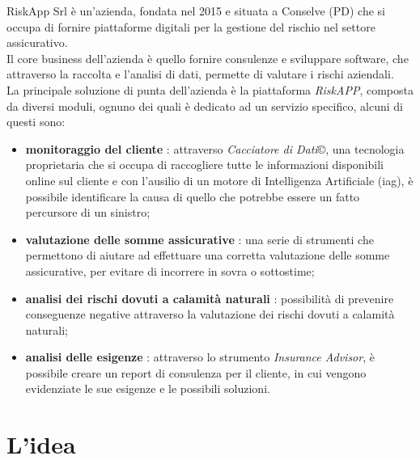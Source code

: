 RiskApp Srl è un'azienda, fondata nel 2015 e situata a Conselve (PD) che si occupa di fornire piattaforme digitali per la gestione del rischio nel settore assicurativo.\\
\indent Il core business dell'azienda è quello fornire consulenze e sviluppare software, che attraverso la raccolta e l'analisi di dati, permette di valutare i rischi aziendali. \\
\indent La principale soluzione di punta dell'azienda è la piattaforma \emph{RiskAPP}, composta da diversi moduli, ognuno dei quali è dedicato ad un servizio specifico, alcuni di questi sono:
\begin{itemize}
    \item \textbf{monitoraggio del cliente} \cite{site:riskapp}: attraverso \emph{Cacciatore di Dati}\copyright, una tecnologia proprietaria che si occupa di raccogliere tutte le informazioni disponibili online sul cliente e con l'ausilio di un motore di Intelligenza Artificiale (\gls{iag}\glsoccur), è possibile identificare la causa di quello che potrebbe essere un fatto percursore di un sinistro;
    \item \textbf{valutazione delle somme assicurative} \cite{site:riskapp}: una serie di strumenti che permettono di aiutare ad effettuare una corretta valutazione delle somme assicurative, per evitare di incorrere in sovra o sottostime;
    \item \textbf{analisi dei rischi dovuti a calamità naturali} \cite{site:riskapp}: possibilità di prevenire conseguenze negative attraverso la valutazione dei rischi dovuti a calamità naturali;
    \item \textbf{analisi delle esigenze} \cite{site:riskapp}: attraverso lo strumento \emph{Insurance Advisor}, è possibile creare un report di consulenza per il cliente, in cui vengono evidenziate le sue esigenze e le possibili soluzioni.
\end{itemize}

\section{L'idea}
\label{sec:idea}

